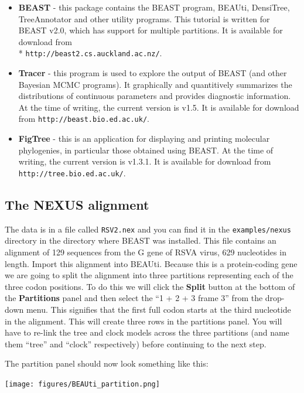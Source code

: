 \documentclass[12pt]{article}
\newcommand{\BEASTVersion}{2.0}
\newcommand{\TracerVersion}{1.5}
\newcommand{\FigTreeVersion}{1.3.1}
\begin{document}
\begin{itemize}
\item {\bf BEAST} - this package contains the BEAST program, BEAUti, DensiTree, TreeAnnotator and other utility programs. This tutorial is written for BEAST v{\BEASTVersion}, which has support for multiple partitions. It is available for download from \\* \texttt{http://beast2.cs.auckland.ac.nz/}.
\item {\bf Tracer} - this program is used to explore the output of BEAST (and other Bayesian MCMC programs). It graphically and
quantitively summarizes the distributions of continuous parameters and provides diagnostic information. At the time of
writing, the current version is v{\TracerVersion}. It is available for download from \texttt{http://beast.bio.ed.ac.uk/}.
\item {\bf FigTree} - this is an application for displaying and printing molecular phylogenies, in particular those obtained using
BEAST. At the time of writing, the current version is v{\FigTreeVersion}. It is available for download from \texttt{http://tree.bio.ed.ac.uk/}.
\end{itemize}

\subsection*{The NEXUS alignment}
The data is in a file called \texttt{RSV2.nex} and you can find it in the {\tt examples/nexus} directory in the directory where BEAST was installed. This file contains an alignment of 129 sequences from the G gene of RSVA virus, 629 nucleotides in length. Import this alignment into BEAUti. Because this is a protein-coding gene we are going to split the alignment into three partitions representing each of the three codon positions. To do this we will click the {\bf Split} button at the bottom of the {\bf Partitions} panel and then select the ``1 + 2 + 3 frame 3'' from the drop-down menu. This signifies that the first full codon starts at the third nucleotide in the alignment. This will create three rows in the partitions panel. You will have to re-link the tree and clock models across the three partitions (and name them ``tree'' and ``clock'' respectively) before continuing to the next step.

The partition panel should now look something like this:

\begin{center}
\texttt{[image: figures/BEAUti\_partition.png]}%
\end{center}
\end{document}
